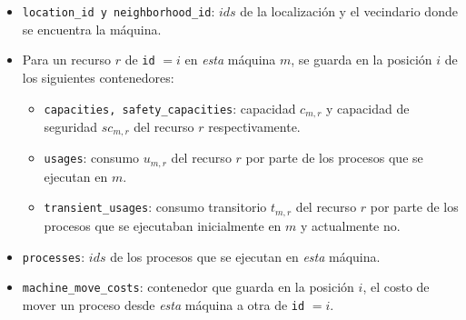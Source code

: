 \documentclass[../informe2.tex]{subfiles}
\begin{document}
\noindent\begin{minipage}{0.3\textwidth}
\end{minipage}\hfill
\begin{minipage}{0.6\textwidth}
	\small
	\begin{itemize}
		\item \texttt{location\_id y neighborhood\_id}: $ids$ de la localización y el vecindario donde se encuentra la máquina.
		\item Para un recurso $r$ de \texttt{id}  $=i$ en \textit{esta} máquina $m$, se guarda en la posición $i$ de los siguientes contenedores:
		\begin{itemize}
			\item \texttt{capacities, safety\_capacities}: capacidad $c_{m,r}$ y capacidad de seguridad $sc_{m,r}$ del recurso $r$ respectivamente.
			\item \texttt{usages}: consumo $u_{m,r}$ del recurso $r$ por parte de los procesos que se ejecutan en $m$.
			\item \texttt{transient\_usages}: consumo transitorio $t_{m,r}$ del recurso $r$ por parte de los procesos que se ejecutaban inicialmente en $m$ y actualmente no.
		\end{itemize}
		\item \texttt{processes}: $ids$ de los procesos que se ejecutan en \textit{esta} máquina.
		\item \texttt{machine\_move\_costs}: contenedor que guarda en la posición $i$, el costo de mover un proceso desde \textit{esta} máquina a otra de \texttt{id} $=i$.
	\end{itemize}
\end{minipage}

\bigskip
\end{document}
